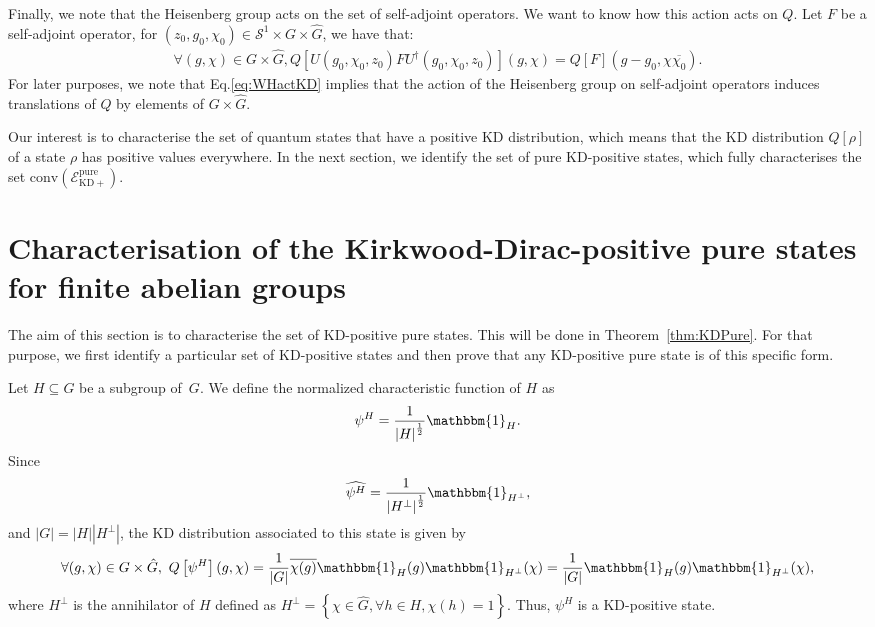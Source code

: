 \documentclass[a4paper, notitlepage, 11pt]{article}
\numberwithin{equation}{section}
\newcommand{\mcl}[1]{\ensuremath{\mathcal{#1}}}
\newcommand{\EcalKDCpu}{{\mcl E}_{\mathrm{KD+}}^{\mathrm{pure}}}
\newcommand{\conv}[1]{\mathrm{conv}\left(#1\right)}
\begin{document}
Finally, we note that the Heisenberg group acts on the set of self-adjoint operators. We want to know how this action acts on $Q$. Let $F$ be a self-adjoint operator, for $(z_{0},g_0,\chi_0)\in \mcl{S}^1\times G\times\hat{G}$, we have that:
\begin{eqnarray}\label{eq:WHactKD}
    \forall (g,\chi)\in G\times\hat{G}, Q[U(g_0,\chi_0,z_0)F U^{\dagger}(g_0,\chi_0,z_0)](g,\chi) = Q[F](g-g_0,\chi\overline{\chi_{0}}).
\end{eqnarray}
For later purposes, we note that Eq.\eqref{eq:WHactKD} implies that the action of the Heisenberg group on self-adjoint operators induces  translations of $Q$ by elements of $G\times\hat G$. 

Our interest is to characterise the set of quantum states that have a positive KD distribution, which means that the KD distribution $Q[\rho]$ of a state $\rho$ has positive values everywhere. In the next section, we identify the set of pure KD-positive states, which fully characterises the set $\conv{\EcalKDCpu}$.

\section{Characterisation of the Kirkwood-Dirac-positive pure states for finite abelian groups}
\label{sec:charKDpurepos}
The aim of this section is to characterise the set of KD-positive pure states. This will be done in Theorem~\ref{thm:KDPure}. For that purpose, we first identify a particular set of KD-positive states and then prove that any KD-positive pure state is of this specific form.

Let $H\subseteq G$ be a subgroup of~$G$.  We define the normalized characteristic function of $H$ as 
\begin{equation}\label{def:KDPure1}
\psi^{H} = \frac{1}{\left|H\right|^{\frac{1}{2}}}\mathbbm{1}_{H}.
\end{equation}
Since
\begin{equation}
    \widehat{\psi^H}=\frac{1}{\left|H^\perp\right|^{\frac{1}{2}}}\mathbbm{1}_{H^\perp},
\end{equation}
and $|G|=|H||H^\perp|$,
the
 KD distribution associated to this state is given by
\[
 \forall (g,\chi)\in G\times\hat{G}, \ Q\left[\psi^{H}\right](g,\chi)= \frac{1}{\left|G\right|}\overline{\chi(g)}\mathbbm{1}_{H}(g)\mathbbm{1}_{H^{\perp}}(\chi) = \frac{1}{\left|G\right|}\mathbbm{1}_{H}(g)\mathbbm{1}_{H^{\perp}}(\chi),
\]
where $H^{\perp}$ is the annihilator of $H$ defined as $H^{\perp} = \left\{ \chi \in \hat{G}, \forall h \in H, \chi(h) = 1 \right\}$. Thus, $\psi^{H}$ is a KD-positive state.
\end{document}
